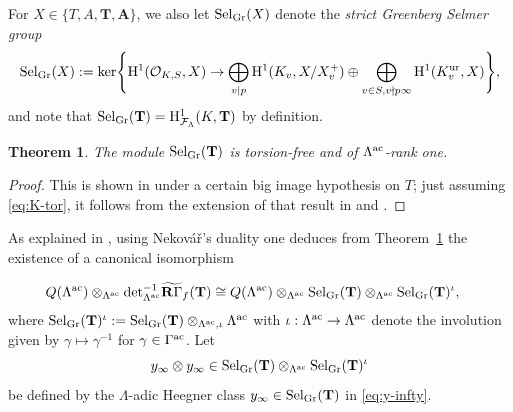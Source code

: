 \documentclass[10pt,reqno]{amsart}
\numberwithin{equation}{section}
\theoremstyle{plain}
\newtheorem{thm}{Theorem}[subsection] %
\theoremstyle{definition}
\theoremstyle{definition}
\theoremstyle{plain}
\theoremstyle{plain}
\theoremstyle{plain}
\theoremstyle{plain}
\theoremstyle{plain}
\theoremstyle{plain}
\newcommand{\Tac}{\mathbf{T}}
\newcommand{\Tc}{\mathbf{T}}
\newcommand{\Fcal}{\mathcal{F}}
\newcommand{\rH}{\mathrm{H}}
\begin{document}
For $X\in\{T,A,\Tac,\mathbf{A}\}$, we also let ${\rm Sel}_{\rm Gr}(X)$ denote the \emph{strict Greenberg Selmer group} 
\begin{equation}\label{eq:str-Gr-T}
{\rm Sel}_{\rm Gr}(X):={\rm ker}\Biggl\{\rH^1(\mathcal{O}_{K,S},X)\rightarrow\bigoplus_{v\mid p}\rH^1(K_v,X/X_v^+)\oplus\bigoplus_{v\in S, v\nmid p\infty}\rH^1(K_v^{\rm ur},X)\Biggr\},
\end{equation}
and note that ${\rm Sel}_{\rm Gr}(\Tc)=\rH^1_{\Fcal_\Lambda}(K,\Tc)$ by definition.

\begin{thm}\label{thm:rank-1}
The module ${\rm Sel}_{\rm Gr}(\Tac)$ is torsion-free and of $\Lambda^{\rm ac}$-rank one.
\end{thm}

\begin{proof}
This is shown in \cite[Thm.~B]{howard} under a certain big image hypothesis on $T$; just assuming \eqref{eq:K-tor}, it follows from the extension of that result in \cite[Thm.~3.4.1]{eisenstein} and \cite[Thm.~6.5.2]{eisenstein_cyc}.
\end{proof}

As explained in \cite[\S{5.2.2}]{kataoka-sano}, using Nekov{\'a}{\v{r}}'s duality \cite[(8.9.6.2)]{nekovar-310}   one deduces from Theorem~\ref{thm:rank-1} the existence of a canonical isomorphism

\begin{equation}\label{eq:duality}
\begin{aligned}
Q(\Lambda^{\rm ac})\otimes_{\Lambda^{\rm ac}}{\rm det}_{\Lambda^{\rm ac}}^{-1}\widetilde{\mathbf{R}\Gamma}_f(\Tac)
&\cong Q(\Lambda^{\rm ac})\otimes_{\Lambda^{\rm ac}}{\rm Sel}_{\rm Gr}(\Tac)\otimes_{\Lambda^{\rm ac}}{\rm Sel}_{\rm Gr}(\Tac)^\iota,
\end{aligned}
\end{equation}
where ${\rm Sel}_{\rm Gr}(\Tac)^\iota:={\rm Sel}_{\rm Gr}(\Tac)\otimes_{\Lambda^{\rm ac}, \iota} {\Lambda^{\rm ac}}$ with $\iota:\Lambda^{\rm ac}\rightarrow\Lambda^{\rm ac}$ denote the involution given by $\gamma\mapsto\gamma^{-1}$ for $\gamma\in\Gamma^{\rm ac}$. 
Let
\[
y_\infty\otimes y_\infty\in{\rm Sel}_{\rm Gr}(\Tac)\otimes_{\Lambda^{\rm ac}}{\rm Sel}_{\rm Gr}(\Tac)^\iota
\]
be defined by the $\Lambda$-adic Heegner class $y_\infty\in{\rm Sel}_{\rm Gr}(\Tac)$ in \eqref{eq:y-infty}. 
\end{document}
